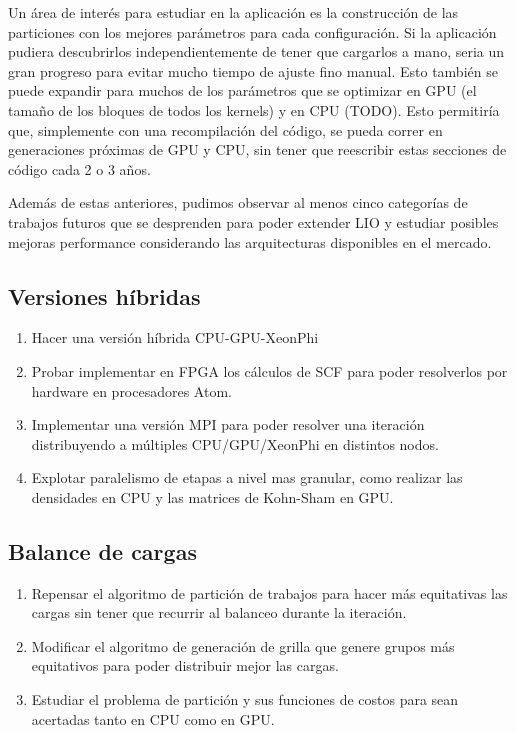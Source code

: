 Un \'area de inter\'es para estudiar en la aplicaci\'on es la construcci\'on de las particiones
con los mejores par\'ametros para cada configuraci\'on. Si la aplicaci\'on pudiera descubrirlos
independientemente de tener que cargarlos a mano, seria un gran progreso para evitar mucho
tiempo de ajuste fino manual. Esto tambi\'en se puede expandir para muchos de los par\'ametros
que se optimizar en GPU (el tama\~no de los bloques de todos los kernels) y en CPU (TODO).
Esto permitir\'ia que, simplemente con una recompilaci\'on del c\'odigo, se pueda correr en generaciones
pr\'oximas de GPU y CPU, sin tener que reescribir estas secciones de c\'odigo cada 2 o 3 a\~nos.

Adem\'as de estas anteriores, pudimos observar al menos cinco categor\'ias de trabajos futuros que se
desprenden para poder extender LIO y estudiar posibles mejoras performance considerando
las arquitecturas disponibles en el mercado.
\subsection{Versiones h\'ibridas}
\begin{enumerate}
 \item Hacer una versi\'on h\'ibrida CPU-GPU-XeonPhi
  \item Probar implementar en FPGA los c\'alculos de SCF para poder resolverlos por hardware en procesadores
    Atom.
  \item Implementar una versi\'on MPI para poder resolver una iteraci\'on distribuyendo
    a m\'ultiples CPU/GPU/XeonPhi en distintos nodos.
  \item Explotar paralelismo de etapas a nivel mas granular, como realizar las densidades en CPU y las matrices
    de Kohn-Sham en GPU.
\end{enumerate}

\subsection{Balance de cargas}
\begin{enumerate}
  \item Repensar el algoritmo de partici\'on de trabajos para hacer m\'as equitativas las cargas sin
    tener que recurrir al balanceo durante la iteraci\'on.
  \item Modificar el algoritmo de generaci\'on de grilla que genere grupos m\'as equitativos para poder
    distribuir mejor las cargas.
  \item Estudiar el problema de partici\'on y sus funciones de costos para sean acertadas tanto en CPU
    como en GPU.
\end{enumerate}

